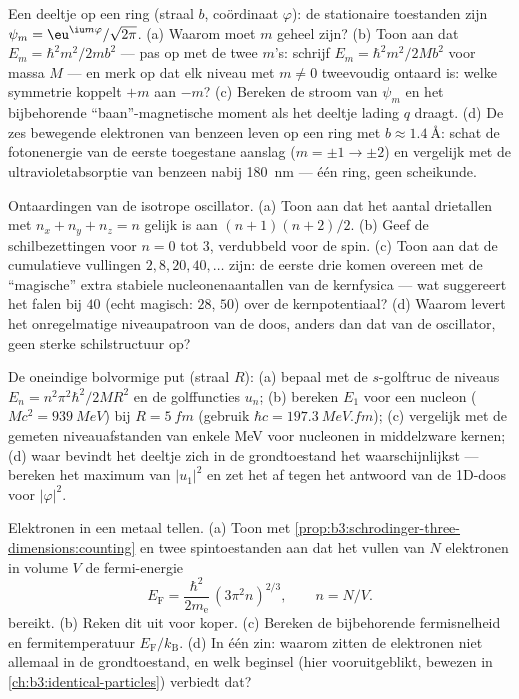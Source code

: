 \begin{exercise}[$\star\star$]\label{exo:b3:schrodinger-three-dimensions:5}
Een deeltje op een ring (straal $b$, coördinaat $\varphi$): de stationaire
toestanden zijn $\psi_m = \eu^{\iu m\varphi}/\sqrt{2\pi}$. (a) Waarom moet
$m$ geheel zijn? (b) Toon aan dat $E_m = \hbar^2m^2/2mb^2$ --- pas op met
de twee $m$'s: schrijf $E_m = \hbar^2 m^2/2Mb^2$ voor massa $M$ --- en
merk op dat elk niveau met $m \neq 0$ tweevoudig ontaard is: welke
symmetrie koppelt $+m$ aan $-m$? (c) Bereken de stroom van $\psi_m$ en het
bijbehorende ``baan''-magnetische moment als het deeltje lading $q$
draagt. (d) De zes bewegende elektronen van benzeen leven op een ring met
$b \approx \qty{1.4}{\angstrom}$: schat de fotonenergie van de eerste
toegestane aanslag ($m = \pm1 \to \pm2$) en vergelijk met de
ultravioletabsorptie van benzeen nabij \qty{180}{nm} --- één ring, geen
scheikunde.
\end{exercise}

\begin{exercise}[$\star\star$]\label{exo:b3:schrodinger-three-dimensions:6}
Ontaardingen van de isotrope oscillator. (a) Toon aan dat het aantal
drietallen met $n_x + n_y + n_z = n$ gelijk is aan $(n+1)(n+2)/2$. (b)
Geef de schilbezettingen voor $n = 0$ tot $3$, verdubbeld voor de spin.
(c) Toon aan dat de cumulatieve vullingen $2, 8, 20, 40, \dots$ zijn: de
eerste drie komen overeen met de ``magische'' extra stabiele
nucleonenaantallen van de kernfysica --- wat suggereert het falen bij $40$
(echt magisch: $28$, $50$) over de kernpotentiaal? (d) Waarom levert het
onregelmatige niveaupatroon van de doos, anders dan dat van de oscillator,
geen sterke schilstructuur op?
\end{exercise}

\begin{exercise}[$\star\star$]\label{exo:b3:schrodinger-three-dimensions:7}
De oneindige bolvormige put (straal $R$): (a) bepaal met de $s$-golftruc
de niveaus $E_n = n^2\pi^2\hbar^2/2MR^2$ en de golffuncties $u_n$; (b)
bereken $E_1$ voor een nucleon ($Mc^2 =
\qty{939}{MeV}$) bij $R = \qty{5}{fm}$ (gebruik $\hbar c =
\qty{197.3}{MeV.fm}$); (c) vergelijk met
de gemeten niveauafstanden van enkele MeV voor nucleonen in middelzware
kernen; (d) waar bevindt het deeltje zich in de grondtoestand het
waarschijnlijkst --- bereken het maximum van $|u_1|^2$ en zet het af tegen
het antwoord van de 1D-doos voor $|\varphi|^2$.
\end{exercise}

\begin{exercise}[$\star\star$]\label{exo:b3:schrodinger-three-dimensions:8}
Elektronen in een metaal tellen. (a) Toon met
\cref{prop:b3:schrodinger-three-dimensions:counting} en twee spintoestanden
aan dat het vullen van $N$ elektronen in volume $V$ de fermi-energie
\[
E_{\text{F}} = \frac{\hbar^2}{2m_{\text{e}}}\,(3\pi^2n)^{2/3} ,
\qquad n = N/V .
\]
bereikt. (b) Reken dit uit voor koper. (c) Bereken de bijbehorende
fermisnelheid en fermitemperatuur $E_{\text{F}}/k_{\text{B}}$. (d) In één
zin: waarom zitten de elektronen niet allemaal in de grondtoestand, en
welk beginsel (hier vooruitgeblikt, bewezen in
\cref{ch:b3:identical-particles}) verbiedt dat?
\end{exercise}

